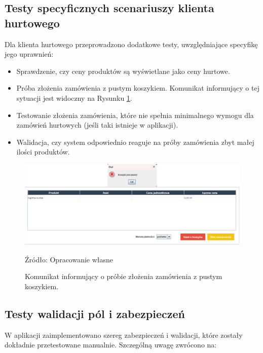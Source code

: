 \begin{minipage}{\linewidth}
\subsection{Testy specyficznych scenariuszy klienta hurtowego}
Dla klienta hurtowego przeprowadzono dodatkowe testy, uwzględniające specyfikę jego uprawnień:
\begin{itemize}
    \item Sprawdzenie, czy ceny produktów są wyświetlane jako ceny hurtowe.
    \item Próba złożenia zamówienia z pustym koszykiem. Komunikat informujący o tej sytuacji jest widoczny na Rysunku \ref{fig:pusty_koszyk}.
    \item Testowanie złożenia zamówienia, które nie spełnia minimalnego wymogu dla zamówień hurtowych (jeśli taki istnieje w aplikacji).
    \item Walidacja, czy system odpowiednio reaguje na próby zamówienia zbyt małej ilości produktów.
\end{itemize}

\begin{figure}[H]
    \centering
    \includegraphics[width=\linewidth]{figures/fig_0006.eps}
    \caption{Komunikat informujący o próbie złożenia zamówienia z pustym koszykiem. }
    \label{fig:pusty_koszyk}
    \small{Źródło: Opracowanie własne}
\end{figure}
\end{minipage}

\subsection{Testy walidacji pól i zabezpieczeń}
W aplikacji zaimplementowano szereg zabezpieczeń i walidacji, które zostały dokładnie przetestowane manualnie. Szczególną uwagę zwrócono na:

